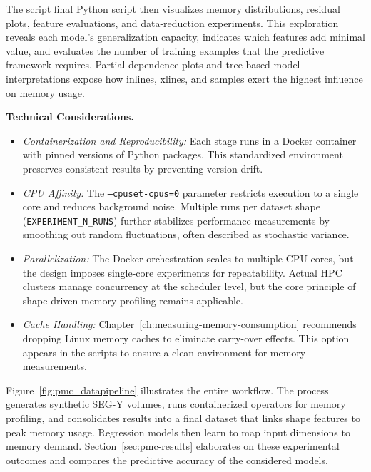 The script final Python script then visualizes memory distributions, residual plots, feature evaluations, and data-reduction experiments.
This exploration reveals each model’s generalization capacity, indicates which features add minimal value, and evaluates the number of training examples that the predictive framework requires.
Partial dependence plots and tree-based model interpretations expose how inlines, xlines, and samples exert the highest influence on memory usage.

\vspace{1em}
\noindent
\textbf{Technical Considerations.}
\begin{itemize}
    \item \emph{Containerization and Reproducibility:}
    Each stage runs in a Docker container with pinned versions of Python packages.
    This standardized environment preserves consistent results by preventing version drift.
    \item \emph{\ac{CPU} Affinity:}
    The \texttt{--cpuset-cpus=0} parameter restricts execution to a single core and reduces background noise.
    Multiple runs per dataset shape (\texttt{EXPERIMENT\_N\_RUNS}) further stabilizes performance measurements by smoothing out random fluctuations, often described as stochastic variance.
    \item \emph{Parallelization:}
    The Docker orchestration scales to multiple \ac{CPU} cores, but the design imposes single-core experiments for repeatability.
    Actual \ac{HPC} clusters manage concurrency at the scheduler level, but the core principle of shape-driven memory profiling remains applicable.
    \item \emph{Cache Handling:}
    Chapter~\ref{ch:measuring-memory-consumption} recommends dropping Linux memory caches to eliminate carry-over effects.
    This option appears in the scripts to ensure a clean environment for memory measurements.
\end{itemize}

\vspace{1em}
\noindent
Figure~\ref{fig:pmc_datapipeline} illustrates the entire workflow.
The process generates synthetic \ac{SEG-Y} volumes, runs containerized operators for memory profiling, and consolidates results into a final dataset that links shape features to peak memory usage.
Regression models then learn to map input dimensions to memory demand.
Section~\ref{sec:pmc-results} elaborates on these experimental outcomes and compares the predictive accuracy of the considered models.

